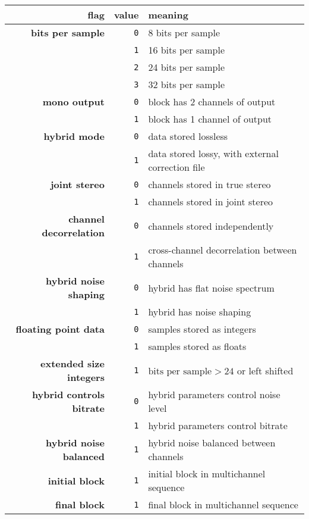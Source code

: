 \clearpage

\begin{table}[h]
{
\begin{tabular}{rrl}
flag & value & meaning \\
\hline
\hline
\textbf{bits per sample} & \texttt{0} & 8 bits per sample \\
& \texttt{1} & 16 bits per sample \\
& \texttt{2} & 24 bits per sample \\
& \texttt{3} & 32 bits per sample \\
\hline
\textbf{mono output} & \texttt{0} & block has 2 channels of output \\
& \texttt{1} & block has 1 channel of output \\
\hline
\textbf{hybrid mode} & \texttt{0} & data stored lossless \\
& \texttt{1} & data stored lossy, with external correction file \\
\hline
\textbf{joint stereo} & \texttt{0} & channels stored in true stereo \\
& \texttt{1} & channels stored in joint stereo \\
\hline
\textbf{channel decorrelation} & \texttt{0} & channels stored independently \\
& \texttt{1} & cross-channel decorrelation between channels \\
\hline
\textbf{hybrid noise shaping} & \texttt{0} & hybrid has flat noise spectrum \\
& \texttt{1} & hybrid has noise shaping \\
\hline
\textbf{floating point data} & \texttt{0} & samples stored as integers \\
& \texttt{1} & samples stored as floats \\
\hline
\textbf{extended size integers} & \texttt{1} & $\text{bits per sample} > 24$ or left shifted \\
\hline
\textbf{hybrid controls bitrate} & \texttt{0} & hybrid parameters control noise level \\
& \texttt{1} & hybrid parameters control bitrate \\
\hline
\textbf{hybrid noise balanced} & \texttt{1} & hybrid noise balanced between channels \\
\hline
\textbf{initial block} & \texttt{1} & initial block in multichannel sequence \\
\hline
\textbf{final block} & \texttt{1} & final block in multichannel sequence \\

\end{tabular}}
\end{table}
